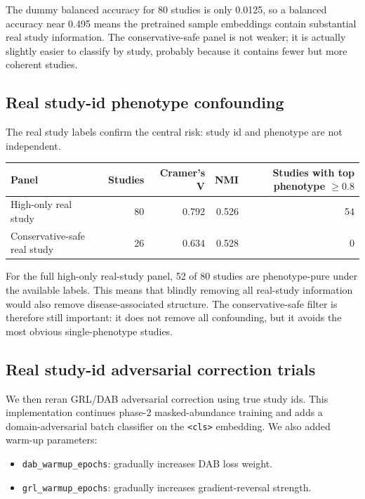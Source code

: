 \documentclass[11pt]{article}
\newcommand{\code}[1]{\texttt{\small #1}}
\begin{document}
The dummy balanced accuracy for 80 studies is only 0.0125, so a balanced accuracy near
0.495 means the pretrained sample embeddings contain substantial real study information.
The conservative-safe panel is not weaker; it is actually slightly easier to classify by
study, probably because it contains fewer but more coherent studies.

\subsection{Real study-id phenotype confounding}

The real study labels confirm the central risk: study id and phenotype are not
independent.

\begin{center}
\begin{tabular}{lrrrr}
\toprule
Panel & Studies & Cramer's V & NMI & Studies with top phenotype $\geq 0.8$ \\
\midrule
High-only real study & 80 & 0.792 & 0.526 & 54 \\
Conservative-safe real study & 26 & 0.634 & 0.528 & 0 \\
\bottomrule
\end{tabular}
\end{center}

For the full high-only real-study panel, 52 of 80 studies are phenotype-pure under the
available labels. This means that blindly removing all real-study information would also
remove disease-associated structure. The conservative-safe filter is therefore still
important: it does not remove all confounding, but it avoids the most obvious
single-phenotype studies.

\subsection{Real study-id adversarial correction trials}

We then reran GRL/DAB adversarial correction using true study ids. This implementation
continues phase-2 masked-abundance training and adds a domain-adversarial batch
classifier on the \code{<cls>} embedding. We also added warm-up parameters:

\begin{itemize}
  \item \code{dab\_warmup\_epochs}: gradually increases DAB loss weight.
  \item \code{grl\_warmup\_epochs}: gradually increases gradient-reversal strength.
\end{itemize}
\end{document}
